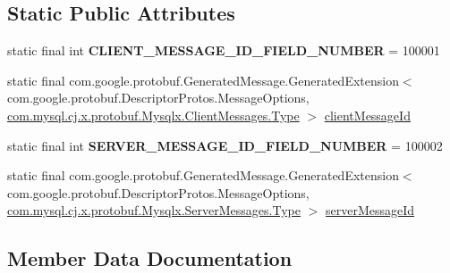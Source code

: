 \subsection*{Static Public Attributes}
\begin{DoxyCompactItemize}
\item 
\mbox{\label{classcom_1_1mysql_1_1cj_1_1x_1_1protobuf_1_1_mysqlx_a2b5009d9317fab5353083025222397dc}} 
static final int {\bfseries C\+L\+I\+E\+N\+T\+\_\+\+M\+E\+S\+S\+A\+G\+E\+\_\+\+I\+D\+\_\+\+F\+I\+E\+L\+D\+\_\+\+N\+U\+M\+B\+ER} = 100001
\item 
static final com.\+google.\+protobuf.\+Generated\+Message.\+Generated\+Extension$<$ com.\+google.\+protobuf.\+Descriptor\+Protos.\+Message\+Options, \mbox{\hyperlink{enumcom_1_1mysql_1_1cj_1_1x_1_1protobuf_1_1_mysqlx_1_1_client_messages_1_1_type}{com.\+mysql.\+cj.\+x.\+protobuf.\+Mysqlx.\+Client\+Messages.\+Type}} $>$ \mbox{\hyperlink{classcom_1_1mysql_1_1cj_1_1x_1_1protobuf_1_1_mysqlx_a51cf8a943a8b670b469c2ec2726222a0}{client\+Message\+Id}}
\item 
\mbox{\label{classcom_1_1mysql_1_1cj_1_1x_1_1protobuf_1_1_mysqlx_aa7289b91ec6f2fb3f9094f456796995c}} 
static final int {\bfseries S\+E\+R\+V\+E\+R\+\_\+\+M\+E\+S\+S\+A\+G\+E\+\_\+\+I\+D\+\_\+\+F\+I\+E\+L\+D\+\_\+\+N\+U\+M\+B\+ER} = 100002
\item 
static final com.\+google.\+protobuf.\+Generated\+Message.\+Generated\+Extension$<$ com.\+google.\+protobuf.\+Descriptor\+Protos.\+Message\+Options, \mbox{\hyperlink{enumcom_1_1mysql_1_1cj_1_1x_1_1protobuf_1_1_mysqlx_1_1_server_messages_1_1_type}{com.\+mysql.\+cj.\+x.\+protobuf.\+Mysqlx.\+Server\+Messages.\+Type}} $>$ \mbox{\hyperlink{classcom_1_1mysql_1_1cj_1_1x_1_1protobuf_1_1_mysqlx_aa80c35e06003c6b88c27f1dc6284db4b}{server\+Message\+Id}}
\end{DoxyCompactItemize}


\subsection{Member Data Documentation}
\mbox{\label{classcom_1_1mysql_1_1cj_1_1x_1_1protobuf_1_1_mysqlx_a51cf8a943a8b670b469c2ec2726222a0}} 
